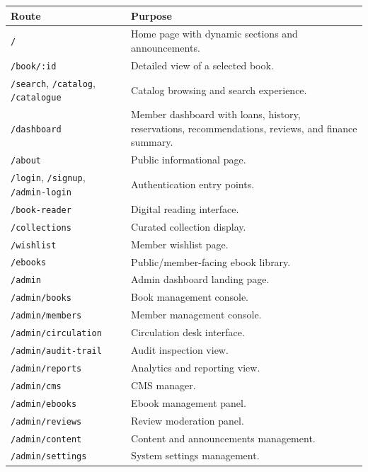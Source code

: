 \documentclass[12pt,a4paper]{report}
\begin{document}
\begin{longtable}{p{} p{}}
\toprule
\textbf{Route} & \textbf{Purpose} \\
\midrule
\endhead
\texttt{/} & Home page with dynamic sections and announcements. \\
\texttt{/book/:id} & Detailed view of a selected book. \\
\texttt{/search}, \texttt{/catalog}, \texttt{/catalogue} & Catalog browsing and search experience. \\
\texttt{/dashboard} & Member dashboard with loans, history, reservations, recommendations, reviews, and finance summary. \\
\texttt{/about} & Public informational page. \\
\texttt{/login}, \texttt{/signup}, \texttt{/admin-login} & Authentication entry points. \\
\texttt{/book-reader} & Digital reading interface. \\
\texttt{/collections} & Curated collection display. \\
\texttt{/wishlist} & Member wishlist page. \\
\texttt{/ebooks} & Public/member-facing ebook library. \\
\texttt{/admin} & Admin dashboard landing page. \\
\texttt{/admin/books} & Book management console. \\
\texttt{/admin/members} & Member management console. \\
\texttt{/admin/circulation} & Circulation desk interface. \\
\texttt{/admin/audit-trail} & Audit inspection view. \\
\texttt{/admin/reports} & Analytics and reporting view. \\
\texttt{/admin/cms} & CMS manager. \\
\texttt{/admin/ebooks} & Ebook management panel. \\
\texttt{/admin/reviews} & Review moderation panel. \\
\texttt{/admin/content} & Content and announcements management. \\
\texttt{/admin/settings} & System settings management. \\
\bottomrule
\end{longtable}
\end{document}
